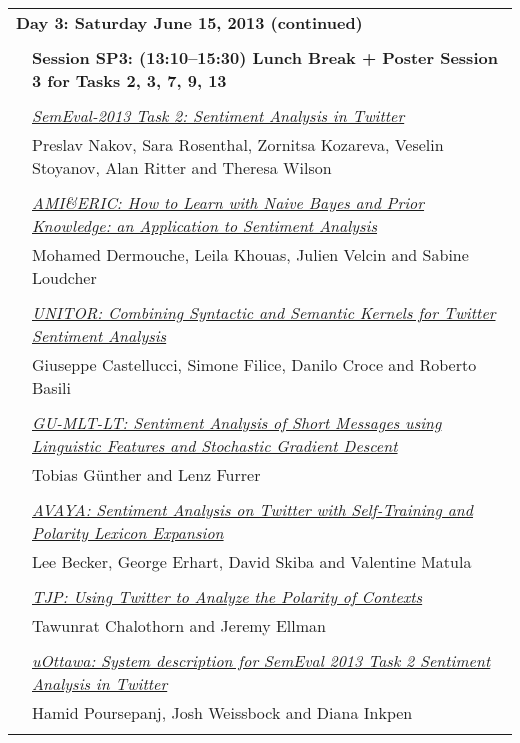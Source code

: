 \begin{tabular}{p{20mm}p{138mm}}
\\
\multicolumn{2}{l}{\bf Day 3: Saturday June 15, 2013 (continued)} \\\\
 & {\bf Session SP3: (13:10--15:30) Lunch Break  + Poster Session 3 for Tasks 2, 3, 7, 9, 13} \\
\\
 
& \hyperlink{page.312}{\em SemEval-2013 Task 2: Sentiment Analysis in Twitter}\\
         & Preslav Nakov, Sara Rosenthal, Zornitsa Kozareva, Veselin Stoyanov, Alan Ritter and Theresa Wilson \\
\\


& \hyperlink{page.364}{\em AMI\&ERIC: How to Learn with Naive Bayes and Prior Knowledge: an Application to Sentiment Analysis}\\
         & Mohamed Dermouche, Leila Khouas, Julien Velcin and Sabine Loudcher \\
\\

 & \hyperlink{page.369}{\em UNITOR: Combining Syntactic and Semantic Kernels for Twitter Sentiment Analysis}\\
         & Giuseppe Castellucci, Simone Filice, Danilo Croce and Roberto Basili \\
\\


& \hyperlink{page.328}{\em GU-MLT-LT: Sentiment Analysis of Short Messages using Linguistic Features and Stochastic Gradient Descent}\\
         & Tobias G\"{u}nther and Lenz Furrer \\
\\


& \hyperlink{page.333}{\em AVAYA: Sentiment Analysis on Twitter with Self-Training and Polarity Lexicon Expansion}\\
         & Lee Becker, George Erhart, David Skiba and Valentine Matula \\
\\


 & \hyperlink{page.375}{\em TJP: Using Twitter to Analyze the Polarity of Contexts}\\
         & Tawunrat Chalothorn and Jeremy Ellman \\
\\

 & \hyperlink{page.380}{\em uOttawa: System description for SemEval 2013 Task 2 Sentiment Analysis in Twitter}\\
         & Hamid Poursepanj, Josh Weissbock and Diana Inkpen \\
\\


\end{tabular}
